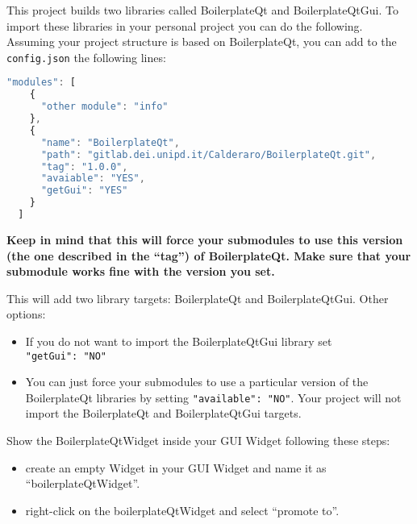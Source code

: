 
This project builds two libraries called BoilerplateQt and
BoilerplateQtGui. To import these libraries in your personal project you
can do the following. Assuming your project structure is based on
BoilerplateQt, you can add to the \texttt{config.json} the following
lines:

\begin{lstlisting}[language=javascript, gobble=2]
  "modules": [
    {
      "other module": "info"
    },
    {
      "name": "BoilerplateQt",
      "path": "gitlab.dei.unipd.it/Calderaro/BoilerplateQt.git",
      "tag": "1.0.0",
      "avaiable": "YES",
      "getGui": "YES"
    }
  ]
\end{lstlisting}

\textbf{Keep in mind that this will force your submodules to use this version (the one described in the ``tag'') of BoilerplateQt. Make sure that your submodule works fine with the version you set.}

This will add two library targets: BoilerplateQt and BoilerplateQtGui.
Other options:

\begin{itemize}
  \tightlist
  \item
        If you do not want to import the BoilerplateQtGui library set
        \texttt{"getGui":\ "NO"}
\end{itemize}

\begin{itemize}
  \tightlist
  \item
        You can just force your submodules to use a particular version of the
        BoilerplateQt libraries by setting \texttt{"available":\ "NO"}. Your
        project will not import the BoilerplateQt and BoilerplateQtGui
        targets.
\end{itemize}


Show the BoilerplateQtWidget inside your GUI Widget following these
steps:

\begin{itemize}
  \tightlist
  \item
        create an empty Widget in your GUI Widget and name it as
        ``boilerplateQtWidget''.
\end{itemize}

\begin{itemize}
  \tightlist
  \item
        right-click on the boilerplateQtWidget and select ``promote to''.
\end{itemize}

